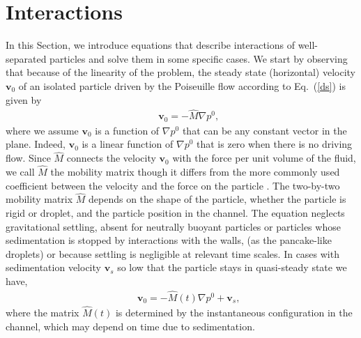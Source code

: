 \section{Interactions}\label{interactions}

In this Section, we introduce equations that describe interactions of well-separated particles and solve them in some specific cases. We start by observing that because of the 
linearity of the problem, the steady state (horizontal) velocity $\bm v_0$ of an isolated particle driven by the Poiseuille flow according to Eq.~(\ref{ds}) is given by
\begin{eqnarray}&&\!\!\!\!\!\!\!\!\!\!
\bm v_0=-{\hat M}\nabla p^0, \label{steady}
\end{eqnarray}
where we assume $\bm v_0$ is a function of $\nabla p^0$ that can be any constant vector in the plane. Indeed, $\bm v_0$ is a linear function of $\nabla p^0$ that is zero when there is no driving flow. Since ${\hat M}$  connects the velocity $\bm v_0$ with the force per unit volume of the fluid,  we call ${\hat M}$ the mobility matrix though it differs 
from the more commonly used coefficient between the velocity and the force on the particle \cite{hb}. 
The two-by-two mobility matrix ${\hat M}$ depends on the shape of the particle, whether the particle is rigid or droplet, and the particle position in the channel. The equation neglects gravitational settling, absent for neutrally buoyant particles or particles whose sedimentation is stopped by interactions with the walls,
(as the pancake-like droplets) or because settling is negligible at relevant time scales. In cases with sedimentation velocity $\bm v_s$ so low that the particle stays in quasi-steady state we have,
\begin{eqnarray}&&\!\!\!\!\!\!\!\!\!\!
\bm v_0=-{\hat M}(t)\nabla p^0+\bm v_s,
\end{eqnarray}
where the matrix ${\hat M}(t)$ is determined by the instantaneous configuration in the channel, which may depend on time due to sedimentation.

